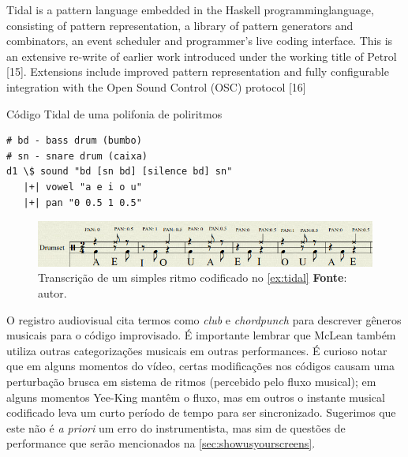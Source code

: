 \begin{citacao}
{Tidal is a pattern language embedded in the Haskell programminglanguage, consisting of pattern representation, a library of pattern generators and combinators, an event scheduler and programmer’s live coding interface. This is an extensive re-write of earlier work introduced under the working title of Petrol [15]. Extensions include improved pattern representation and fully configurable integration with the Open Sound Control (OSC) protocol [16]
}
\end{citacao}

\begin{example}{Código Tidal de uma polifonia de poliritmos}
\begin{verbatim}
# bd - bass drum (bumbo)
# sn - snare drum (caixa)
d1 \$ sound "bd [sn bd] [silence bd] sn"
   |+| vowel "a e i o u"
   |+| pan "0 0.5 1 0.5"
\end{verbatim}
\end{example}\label{ex:tidal}

\begin{figure}[!h]
  \centering
  \includegraphics[scale=0.61]{imagens/tidal_ritmo.png}
  \caption{Transcrição de um simples ritmo codificado no \autoref{ex:tidal} \textbf{Fonte}: autor.}
  \label{fig:canute2}
\end{figure}

O registro audiovisual cita termos como \emph{club} e \emph{chordpunch} para descrever gêneros musicais para o código improvisado. É importante lembrar que McLean também utiliza outras categorizações musicais em outras performances. É curioso notar que em alguns momentos do vídeo, certas modificações nos códigos causam uma perturbação brusca em sistema de ritmos (percebido pelo fluxo musical); em alguns momentos Yee-King mantêm o fluxo, mas em outros o instante musical codificado leva um curto período de tempo para ser sincronizado. Sugerimos que este não é  \emph{a priori} um erro do instrumentista, mas sim de questões de performance que serão mencionados na \autoref{sec:showusyourscreens}.

